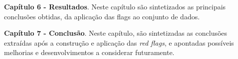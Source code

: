 \begin{my_itemize}
	
	\item \textbf{Capítulo 6 - Resultados}. Neste capítulo são sintetizados as principais conclusões obtidas, da aplicação das flags ao conjunto de dados.

	
	\item \textbf{Capítulo 7 - Conclusão}. Neste capítulo, são sintetizadas as conclusões extraídas após a construção e aplicação das \textit{red flags}, e apontadas possíveis melhorias e desenvolvimentos a considerar futuramente. 


\end{my_itemize}




